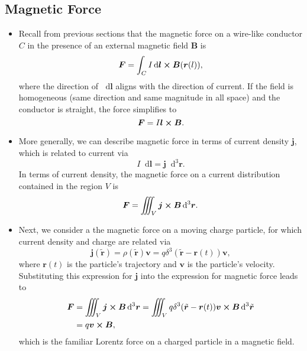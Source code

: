 \documentclass[11pt, a4paper]{article}
\newcommand{\diff}{\mathop{}\!\mathrm{d}} %
\newcommand{\dr}{\diff^{3} \r}  %
\newcommand{\dtr}{\diff^{3} \tilde{\r}}  %
\renewcommand{\vec}[1]{\bm{#1}} %
\renewcommand{\t}[1]{\tilde{#1}} %
\renewcommand{\r}{\vec{r}}
\newcommand{\B}{\vec{B}} %
\renewcommand{\j}{\vec{j}}  %
\begin{document}
\subsection{Magnetic Force}
\begin{itemize}
	\item Recall from previous sections that the magnetic force on a wire-like conductor $ C $ in the presence of an external magnetic field $ \B $ is
	\begin{equation*}
		\vec{F} = \int_{C} I \diff \vec{l} \cross \vec{B}(\r(l)),
	\end{equation*}
	where the direction of $ \diff \vec{l} $ aligns with the direction of current. If the field is homogeneous (same direction and same magnitude in all space) and the conductor is straight, the force simplifies to
	\begin{equation*}
		\vec{F} = I \vec{l} \cross \vec{B}.
	\end{equation*}
	
	\item More generally, we can describe magnetic force in terms of current density $ \j $, which is related to current via
	\begin{equation*}
		I \diff \vec{l} = \vec{j} \dr.
	\end{equation*}
    In terms of current density, the magnetic force on a current distribution contained in the region $ V $ is
	\begin{equation*}
		\vec{F} = \iiint_{V} \vec{j} \cross \vec{B} \dr.
	\end{equation*}
	
	\item Next, we consider a the magnetic force on a moving charge particle, for which current density and charge are related via
	\begin{equation*}
		\vec{j}(\t{\r}) = \rho(\t{\r}) \vec{v} = q \delta^{3}(\t{\r} - \r(t))\vec{v},
	\end{equation*}
	where $ \r(t) $ is the particle's trajectory and $ \vec{v} $ is the particle's velocity. Substituting this expression for $ \j $ into the expression for magnetic force leads to
	\begin{align*}
		\vec{F} &= \iiint_{V} \j \cross \B \dr = \iiint_{V} q \delta^{3}(\t{\r} - \r(t))\vec{v} \cross \B \dtr\\
		& = q \vec{v} \cross \B,
	\end{align*}
    which is the familiar Lorentz force on a charged particle in a magnetic field.
	
\end{itemize}
\end{document}
